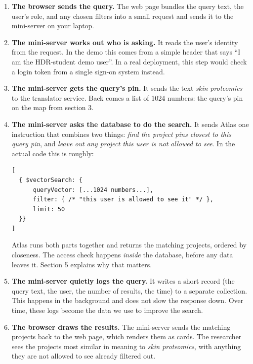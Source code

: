 \documentclass[11pt,a4paper]{article}
\begin{document}
\begin{enumerate}[leftmargin=2em,itemsep=8pt]
  \item \textbf{The browser sends the query.} The web page bundles the query text, the user's role, and any chosen filters into a small request and sends it to the mini-server on your laptop.

  \item \textbf{The mini-server works out who is asking.} It reads the user's identity from the request. In the demo this comes from a simple header that says ``I am the HDR-student demo user''. In a real deployment, this step would check a login token from a single sign-on system instead.

  \item \textbf{The mini-server gets the query's pin.} It sends the text \emph{skin proteomics} to the translator service. Back comes a list of 1024 numbers: the query's pin on the map from section 3.

  \item \textbf{The mini-server asks the database to do the search.} It sends Atlas one instruction that combines two things: \emph{find the project pins closest to this query pin}, and \emph{leave out any project this user is not allowed to see}. In the actual code this is roughly:
  \begin{lstlisting}
[
  { $vectorSearch: {
      queryVector: [...1024 numbers...],
      filter: { /* "this user is allowed to see it" */ },
      limit: 50
  }}
]
  \end{lstlisting}
  Atlas runs both parts together and returns the matching projects, ordered by closeness. The access check happens \emph{inside} the database, before any data leaves it. Section 5 explains why that matters.

  \item \textbf{The mini-server quietly logs the query.} It writes a short record (the query text, the user, the number of results, the time) to a separate collection. This happens in the background and does not slow the response down. Over time, these logs become the data we use to improve the search.

  \item \textbf{The browser draws the results.} The mini-server sends the matching projects back to the web page, which renders them as cards. The researcher sees the projects most similar in meaning to \emph{skin proteomics}, with anything they are not allowed to see already filtered out.
\end{enumerate}
\end{document}
